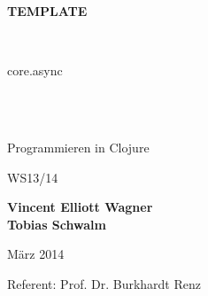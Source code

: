 \thispagestyle{empty}

\begin{center}


{\Huge \textbf{TEMPLATE} }


\vspace{10mm}

{\Huge \thetitle}\\

\vspace{20mm}
\begin{huge}
core.async
\end{huge}
\\
\ \\
\begin{huge}
Programmieren in Clojure
\end{huge}

\vspace{15mm}

\begin{Large}
WS13/14
\end{Large}

\vspace{15mm}
\begin{Large}
\textbf{Vincent Elliott Wagner}\\
\textbf{Tobias Schwalm}\\
\end{Large}
\vspace{15mm}
\begin{large}
März 2014
\end{large}

\vspace{15mm}
\begin{large}
Referent: Prof. Dr. Burkhardt Renz\\
\end{large}

\end{center}